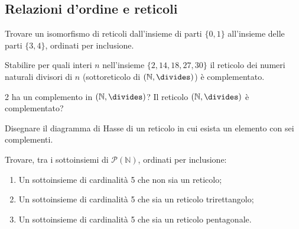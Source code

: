 \subsection{Relazioni d'ordine e reticoli}
\begin{exsbox}
	Trovare un isomorfismo di reticoli dall'insieme di parti $\{0,1\}$ all'insieme delle parti $\{3,4\}$, ordinati per inclusione.
\end{exsbox}
\begin{exsbox}
	Stabilire per quali interi $n$ nell'insieme $\{2,14,18,27,30\}$ il reticolo dei numeri naturali divisori di $n$ (sottoreticolo di $(\mathbb{N},\divides)$) è complementato.
\end{exsbox}
\begin{exsbox}
	2 ha un complemento in $(\mathbb{N},\divides)$? Il reticolo $(\mathbb{N},\divides)$ è complementato?
\end{exsbox}
\begin{exsbox}
	Disegnare il diagramma di Hasse di un reticolo in cui esista un elemento con sei complementi.
\end{exsbox}
\begin{exsbox}
	Trovare, tra i sottoinsiemi di $\mathcal{P}(\mathbb{N})$, ordinati per inclusione:
	\begin{enumerate}
		\item Un sottoinsieme di cardinalità 5 che non sia un reticolo;
		\item Un sottoinsieme di cardinalità 5 che sia un reticolo trirettangolo;
		\item Un sottoinsieme di cardinalità 5 che sia un reticolo pentagonale.
	\end{enumerate}
\end{exsbox}
